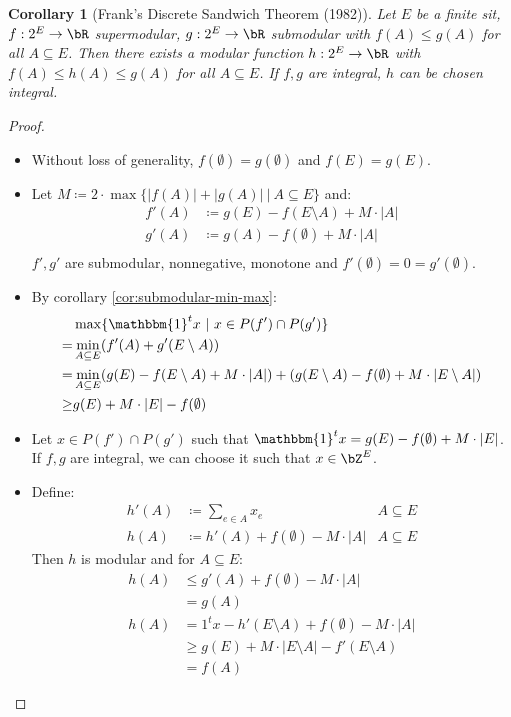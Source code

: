 \documentclass[11pt, a4paper]{article}
\newcommand{\abs}[1]{\left\lvert#1\right\rvert}
\newcommand{\set}[1]{\{#1\}}
\newtheorem{cor}[theorem]{Corollary}
\theoremstyle{remark}
\theoremstyle{definition}
\begin{document}
\begin{cor}[Frank's Discrete Sandwich Theorem (1982)]
	Let $E$ be a finite sit, $f: 2^E\to\bR$ supermodular, $g: 2^E\to\bR$
	submodular with $f(A)\leq g(A)$ for all $A\subseteq E$. Then there
	exists a modular function $h: 2^E\to\bR$ with $f(A)\leq h(A)\leq g(A)$
	for all $A\subseteq E$. If $f,g$ are integral, $h$ can be chosen integral.
\end{cor}
\begin{proof}\
	\begin{itemize}
		\item Without loss of generality, $f(\emptyset)=g(\emptyset)$ and
		$f(E)=g(E)$.

		\item Let $M\coloneqq 2\cdot\max\set{\abs{f(A)}+\abs{g(A)}\ |\ A\subseteq
				E}$ and:
		\begin{align*}
			f'(A) & \coloneqq g(E)-f(E\setminus A)+M\cdot\abs{A} \\
			g'(A) & \coloneqq g(A)-f(\emptyset)+M\cdot\abs{A}    \\
		\end{align*}
		$f',g'$ are submodular, nonnegative, monotone and $f'(\emptyset)=0=
			g'(\emptyset)$.

		\item By corollary \ref{cor:submodular-min-max}:
		\begin{align*}
			     & \max\set{\mathbbm{1}^tx\ |\ x\in P(f')\cap P(g')}       \\
			=    & \min_{A\subseteq E}(f'(A)+g'(E\setminus A))             \\
			=    & \min_{A\subseteq E}(g(E)-f(E\setminus A)+M\cdot\abs{A})
			+ (g(E\setminus A)-f(\emptyset)+M\cdot\abs{E\setminus A})      \\
			\geq & g(E)+M\cdot\abs{E}-f(\emptyset)
		\end{align*}

		\item Let $x\in P(f')\cap P(g')$ such that $\mathbbm{1}^tx=g(E)
			-f(\emptyset)+M\cdot\abs{E}$. If $f,g$ are integral, we can choose it
		such that $x\in \bZ^E$.

		\item Define:
		\begin{align*}
			h'(A) & \coloneqq \sum_{e\in A}x_e                 & A\subseteq E \\
			h(A)  & \coloneqq h'(A)+f(\emptyset)-M\cdot\abs{A} & A\subseteq E
		\end{align*}
		Then $h$ is modular and for $A\subseteq E$:
		\begin{align*}
			h(A) & \leq g'(A)+f(\emptyset)-M\cdot\abs{A}               \\
			     & =g(A)                                               \\
			h(A) & =1^tx - h'(E\setminus A)+f(\emptyset)-M\cdot\abs{A} \\
			     & \geq g(E)+M\cdot\abs{E\setminus A}-f'(E\setminus A) \\
			     & =f(A)
		\end{align*}
	\end{itemize}
\end{proof}
\end{document}
